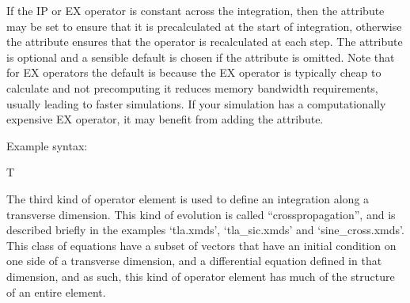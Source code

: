 \documentclass[letterpaper,10pt,english]{sphinxmanual}
\begin{document}
\ignorespaces 
\sphinxAtStartPar
If the IP or EX operator is constant across the integration, then the attribute  may be set to ensure that it is precalculated at the start of integration, otherwise the  attribute ensures that the operator is recalculated at each step.  The  attribute is optional and a sensible default is chosen if the attribute is omitted.  Note that for EX operators the default is  because the EX operator is typically cheap to calculate and not precomputing it reduces memory bandwidth requirements, usually leading to faster simulations.  If your simulation has a computationally expensive EX operator, it may benefit from adding the  attribute.

\sphinxAtStartPar
Example syntax:

\begin{sphinxVerbatim}[commandchars=\\\{\}]
  
  T
  \PYG{c+cp}{\PYGZlt{}![CDATA[}
      
  \PYG{c+cp}{]]\PYGZgt{}}
\end{sphinxVerbatim}

\ignorespaces 
\sphinxAtStartPar
The third kind of operator element is used to define an integration along a transverse dimension.  This kind of evolution is called “cross\sphinxhyphen{}propagation”, and is described briefly in the examples ‘tla.xmds’, ‘tla\_sic.xmds’ and ‘sine\_cross.xmds’.  This class of equations have a subset of vectors that have an initial condition on one side of a transverse dimension, and a differential equation defined in that dimension, and as such, this kind of operator element has much of the structure of an entire {\hyperref[\detokenize{reference_elements:integrateelement}]{}} element.
\end{document}
